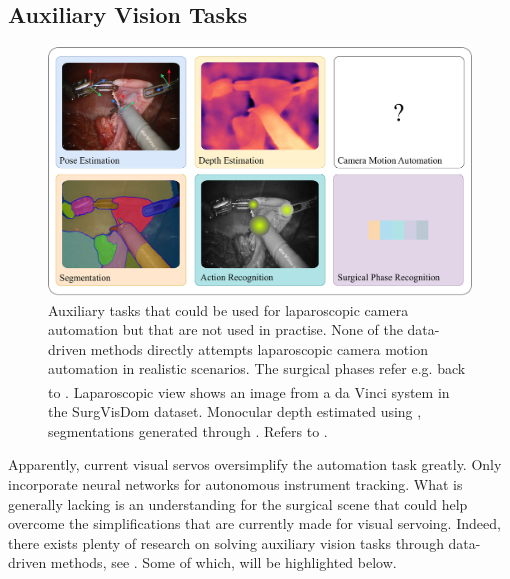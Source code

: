 \subsection{Auxiliary Vision Tasks}
\label{in:sec:auxiliary_tasks}
\begin{figure}[tb]
    \centering
    \includegraphics[width=\textwidth]{introduction/fig/auxiliary_tasks.pdf}
    \caption{Auxiliary tasks that could be used for laparoscopic camera automation but that are not used in practise. None of the data-driven methods directly attempts laparoscopic camera motion automation in realistic scenarios. The surgical phases refer e.g. back to . Laparoscopic view shows an image from a da Vinci\textsuperscript{\textregistered} system in the SurgVisDom\cite{zia2021surgical} dataset. Monocular depth estimated using \cite{oquab2023dinov2}, segmentations generated through \cite{segment_anything}. Refers to .}
    \label{in:fig:auxiliary_tasks}
\end{figure}
Apparently, current visual servos oversimplify the automation task greatly. Only \cite{gruijthuijsen2021autonomous} incorporate neural networks for autonomous instrument tracking. What is generally lacking is an understanding for the surgical scene that could help overcome the simplifications that are currently made for visual servoing. Indeed, there exists plenty of research on solving auxiliary vision tasks through data-driven methods, see . Some of which, will be highlighted below. 

